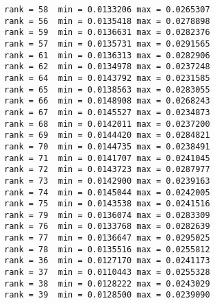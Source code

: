 \begin{lstlisting}
rank = 58  min = 0.0133206 max = 0.0265307
rank = 56  min = 0.0135418 max = 0.0278898
rank = 59  min = 0.0136631 max = 0.0282376
rank = 57  min = 0.0135731 max = 0.0291565
rank = 61  min = 0.0136313 max = 0.0282906
rank = 62  min = 0.0134978 max = 0.0237248
rank = 64  min = 0.0143792 max = 0.0231585
rank = 65  min = 0.0138563 max = 0.0283055
rank = 66  min = 0.0148908 max = 0.0268243
rank = 67  min = 0.0145527 max = 0.0234873
rank = 68  min = 0.0142011 max = 0.0237200
rank = 69  min = 0.0144420 max = 0.0284821
rank = 70  min = 0.0144735 max = 0.0238491
rank = 71  min = 0.0141707 max = 0.0241045
rank = 72  min = 0.0143723 max = 0.0287977
rank = 73  min = 0.0142900 max = 0.0239163
rank = 74  min = 0.0145044 max = 0.0242005
rank = 75  min = 0.0143538 max = 0.0241516
rank = 79  min = 0.0136074 max = 0.0283309
rank = 76  min = 0.0133768 max = 0.0282639
rank = 77  min = 0.0136647 max = 0.0295025
rank = 78  min = 0.0135516 max = 0.0255812
rank = 36  min = 0.0127170 max = 0.0241173
rank = 37  min = 0.0110443 max = 0.0255328
rank = 38  min = 0.0128222 max = 0.0243029
rank = 39  min = 0.0128500 max = 0.0239090
\end{lstlisting}